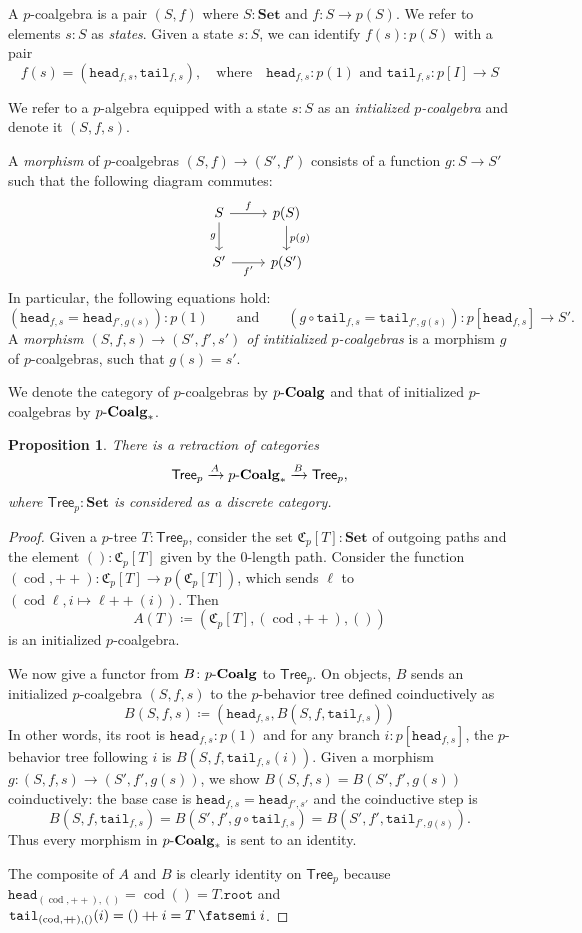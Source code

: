 \documentclass[11pt, one side, article]{memoir}
\theoremstyle{definition}
\theoremstyle{plain}
\newtheorem{proposition}[definitionx]{Proposition}
\newenvironment{definition}
  {\pushQED{\qed}\renewcommand{\qedsymbol}{$\lozenge$}\definitionx}
  {\popQED\enddefinitionx}
\DeclareMathOperator{\cod}{cod}
\newcommand{\Set}[1]{\mathsf{#1}}%
\newcommand{\Cat}[1]{\mathbf{#1}}%
\newcommand{\then}{\mathbin{\fatsemi}}
\newcommand{\To}[2][]{\xrightarrow[#1]{#2}}
\newcommand{\tn}[1]{\textnormal{#1}}
\newcommand{\smset}{\Cat{Set}}
\newcommand{\plpl}{\mathbin{+\!\!+}}
\newcommand{\Cofree}{\mathfrak{C}}
\newcommand{\tree}{\Set{Tree}}
\newcommand{\rt}{\texttt{root}}
\newcommand{\hd}{\texttt{head}}
\newcommand{\tl}{\texttt{tail}}
\newcommand{\qqand}{\qquad\text{and}\qquad}
\newcommand{\coalg}{\tn{-}\Cat{Coalg}}
\begin{document}
\begin{definition}
A $p$-coalgebra is a pair $(S,f)$ where $S:\smset$ and $f\colon S\to p(S)$. We refer to elements $s:S$ as \emph{states}. Given a state $s:S$, we can identify $f(s):p(S)$ with a pair
\[
f(s)=(\hd_{f,s},\tl_{f,s}),\quad\text{where}\quad \hd_{f,s}:p(1)\text{ and } \tl_{f,s}\colon p[I]\to S
\]

We refer to a $p$-algebra equipped with a state $s:S$ as an \emph{intialized $p$-coalgebra} and denote it $(S,f,s)$.
 
A \emph{morphism} of $p$-coalgebras $(S,f)\to(S',f')$ consists of a function $g\colon S\to S'$ such that the following diagram commutes:
\[
\begin{tikzcd}
	S\ar[r, "f"]\ar[d, "g"']&p(S)\ar[d, "p(g)"]\\
	S'\ar[r, "f'"']&p(S')
\end{tikzcd}
\]
In particular, the following equations hold:
\[
(\hd_{f,s}=\hd_{f',g(s)}):p(1)
\qqand
(g\circ\tl_{f,s}=\tl_{f',g(s)})\colon p[\hd_{f,s}]\to S'.
\]
A \emph{morphism $(S,f,s)\to(S',f',s')$ of intitialized $p$-coalgebras} is a morphism $g$ of $p$-coalgebras, such that $g(s)=s'$. 

We denote the category of $p$-coalgebras by $p\coalg$ and that of initialized $p$-coalgebras by $p\coalg_*$.
\end{definition}

\begin{proposition}
There is a retraction of categories
\[
\tree_p\To{A} p\coalg_*\To{B}\tree_p,\]
where $\tree_p:\smset$ is considered as a discrete category.
\end{proposition}
\begin{proof}
Given a $p$-tree $T:\tree_p$, consider the set $\Cofree_p[T]:\smset$ of outgoing paths and the element $():\Cofree_p[T]$ given by the $0$-length path. Consider the function $(\cod,\plpl)\colon \Cofree_p[T]\to p(\Cofree_p[T])$, which sends $\ell$ to $(\cod\ell,i\mapsto \ell\plpl(i))$.
Then
\[A(T)\coloneqq(\Cofree_p[T],(\cod,\plpl),())\]
is an initialized $p$-coalgebra.

We now give a functor from $B\colon p\coalg$ to $\tree_p$. On objects, $B$ sends an initialized $p$-coalgebra $(S,f,s)$ to the $p$-behavior tree defined coinductively as
\[
	B(S,f,s)\coloneqq(\hd_{f,s},B(S,f,\tl_{f,s}))
\]
In other words, its root is $\hd_{f,s}:p(1)$ and for any branch $i:p[\hd_{f,s}]$, the $p$-behavior tree following $i$ is $B(S,f,\tl_{f,s}(i))$. Given a morphism $g\colon (S,f,s)\to (S',f',g(s))$, we show $B(S,f,s)=B(S',f',g(s))$ coinductively: the base case is $\hd_{f,s}=\hd_{f',s'}$ and the coinductive step is
\[
B(S,f,\tl_{f,s})=B(S',f',g\circ\tl_{f,s})=B(S',f',\tl_{f',g(s)}).
\]
Thus every morphism in $p\coalg_*$ is sent to an identity. 

The composite of $A$ and $B$ is clearly identity on $\tree_p$ because $\hd_{(\cod,\plpl),()}=\cod()=T.\rt$ and $\tl_{(\cod,\plpl),()}(i)=()\plpl i=T\then i$.
\end{proof}
\end{document}

